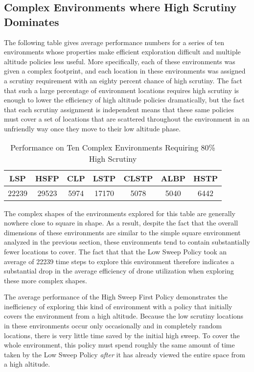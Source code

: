 \subsection{Complex Environments where High Scrutiny Dominates}

The following table gives average performance numbers for a series of ten environments whose properties make efficient exploration difficult and multiple altitude policies less useful. More specifically, each of these environments was given a complex footprint, and each location in these environments was assigned a scrutiny requirement with an eighty percent chance of high scrutiny. The fact that such a large percentage of environment locations requires high scrutiny is enough to lower the efficiency of high altitude policies dramatically, but the fact that each scrutiny assignment is independent means that these same policies must cover a set of locations that are scattered throughout the environment in an unfriendly way once they move to their low altitude phase.

\begin{table}[h]
\begin{center}
 \begin{tabular}{||c c c c c c c ||}
 \hline
 LSP   & HSFP  & CLP  & LSTP  & CLSTP & ALBP & HSTP \\
 \hline
 22239 & 29523 & 5974 & 17170 & 5078  & 5040 & 6442 \\
 \hline
 \end{tabular}
\end{center}
\caption{Performance on Ten Complex Environments Requiring 80\% High Scrutiny}
\end{table}

The complex shapes of the environments explored for this table are generally nowhere close to square in shape. As a result, despite the fact that the overall dimensions of these environments are similar to the simple square environment analyzed in the previous section, these environments tend to contain substantially fewer locations to cover. The fact that that the Low Sweep Policy took an average of 22239 time steps to explore this environment therefore indicates a substantial drop in the average efficiency of drone utilization when exploring these more complex shapes.

The average performance of the High Sweep First Policy demonstrates the inefficiency of exploring this kind of environment with a policy that initially covers the environment from a high altitude. Because the low scrutiny locations in these environments occur only occasionally and in completely random locations, there is very little time saved by the initial high sweep. To cover the whole environment, this policy must spend roughly the same amount of time taken by the Low Sweep Policy \textit{after} it has already viewed the entire space from a high altitude.

